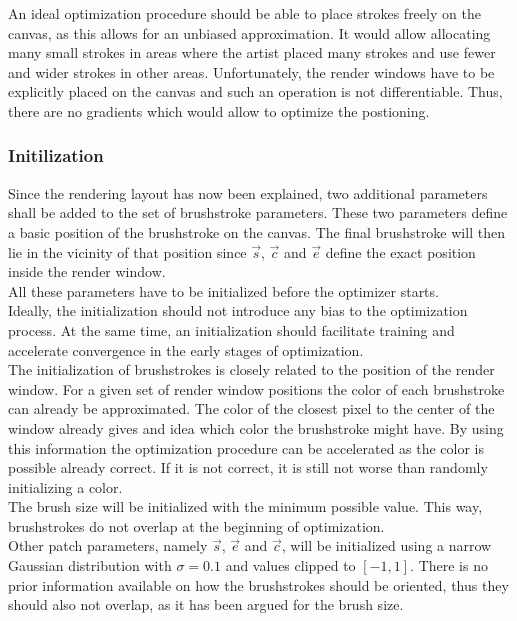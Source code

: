 An ideal optimization procedure should be able to place strokes freely on the canvas, as this allows for an unbiased approximation.
It would allow allocating many small strokes in areas where the artist placed many strokes and use fewer and wider strokes in other areas.
Unfortunately, the render windows have to be explicitly placed on the canvas and such an operation is not differentiable.
Thus, there are no gradients which would allow to optimize the postioning.

\subsubsection{Initilization}
Since the rendering layout has now been explained, two additional parameters shall be added to the set of brushstroke parameters.
These two parameters define a basic position of the brushstroke on the canvas.
The final brushstroke will then lie in the vicinity of that position since $\vec{s}$, $\vec{c}$ and $\vec{e}$ define the exact position inside the render window.\\
All these parameters have to be initialized before the optimizer starts.\\
Ideally, the initialization should not introduce any bias to the optimization process.
At the same time, an initialization should facilitate training and accelerate convergence in the early stages of optimization.\\
The initialization of brushstrokes is closely related to the position of the render window.
For a given set of render window positions the color of each brushstroke can already be approximated.
The color of the closest pixel to the center of the window already gives and idea which color the brushstroke might have.
By using this information the optimization procedure can be accelerated as the color is possible already correct.
If it is not correct, it is still not worse than randomly initializing a color.\\
The brush size will be initialized with the minimum possible value.
This way, brushstrokes do not overlap at the beginning of optimization.\\
Other patch parameters, namely $\vec{s}$, $\vec{e}$ and $\vec{c}$, will be initialized using a narrow Gaussian distribution with $\sigma = 0.1$ and values clipped to $[-1, 1]$.
There is no prior information available on how the brushstrokes should be oriented, thus they should also not overlap, as it has been argued for the brush size.

